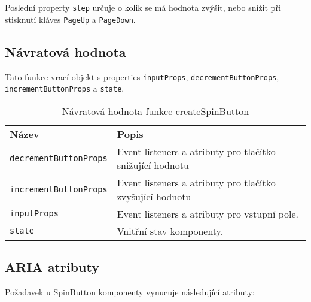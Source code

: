 Poslední property \texttt{step} určuje o kolik se má hodnota zvýšit, nebo snížit při stisknutí kláves \texttt{PageUp} a \texttt{PageDown}.

\subsection{Návratová hodnota}

Tato funkce vrací objekt s properties \texttt{inputProps}, \texttt{decrementButtonProps}, \texttt{incrementButtonProps} a \texttt{state}.

\begin{table}[ht]\label{table:spinbutton-return}
    \begin{ctucolortab}
        \begin{tabularx}{\textwidth}{p{5cm} X}
            \bfseries Název               & \bfseries Popis                                           \\\Midrule{}
            \texttt{decrementButtonProps} & Event listeners a atributy pro tlačítko snižující hodnotu \\
            \texttt{incrementButtonProps} & Event listeners a atributy pro tlačítko zvyšující hodnotu \\
            \texttt{inputProps}           & Event listeners a atributy pro vstupní pole.              \\
            \texttt{state}                & Vnitřní stav komponenty.
        \end{tabularx}
    \end{ctucolortab}
    \caption{Návratová hodnota funkce createSpinButton}
\end{table}

\clearpage

\subsection{ARIA atributy}

Požadavek \hyperref[ofr12]{} u SpinButton komponenty vynucuje následující atributy:

